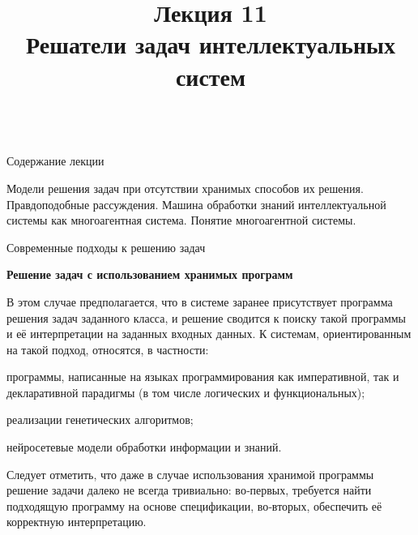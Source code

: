 \title{Лекция 11\\Решатели задач интеллектуальных систем \vspace{-2em}}   

\begin{frame}
	\titlepage
\end{frame}

\begin{frame}{\\Содержание лекции}
	\topline
	\justifying
	
	Модели решения задач при отсутствии хранимых способов их решения. Правдоподобные рассуждения. Машина обработки знаний интеллектуальной системы как многоагентная система. Понятие многоагентной системы.

\end{frame}

\begin{frame}{Современные подходы к решению задач}
	\topline
	\justifying
	\vspace*{\fill}
	
	\footnotesize
	
	\vspace{2mm}
	\textbf{Решение задач с использованием хранимых программ}
	
	\vspace{1mm}
	В этом случае предполагается, что в системе заранее присутствует программа
	решения задач заданного класса, и решение сводится к поиску такой программы
	и её интерпретации на заданных входных данных. К системам, ориентированным
	на такой подход, относятся, в частности:
	\begin{textitemize}
		\item программы, написанные на языках программирования как императивной,
		так и декларативной парадигмы (в том числе логических и функциональных);
		\item реализации генетических алгоритмов;
		\item нейросетевые модели обработки информации и знаний.
	\end{textitemize}
	
	\vspace{1mm}
	Следует отметить, что даже в случае использования хранимой программы
	решение задачи далеко не всегда тривиально: во‑первых, требуется найти
	подходящую программу на основе спецификации, во‑вторых, обеспечить её
	корректную интерпретацию.
	
\end{frame}

